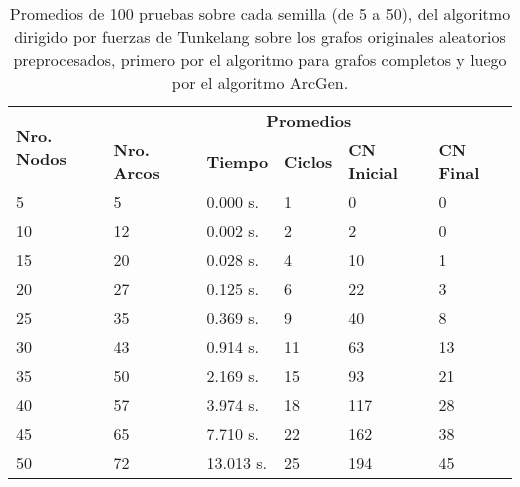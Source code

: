 	
	
	
	
	\begin{table}[H]
		\caption{Promedios de 100 pruebas sobre cada semilla (de 5 a 50), del algoritmo dirigido por fuerzas de Tunkelang sobre los grafos originales aleatorios preprocesados, primero por el algoritmo para grafos completos y luego por el algoritmo ArcGen.}
		\label{tab:resultados_orig_alg_com_gen_fue}
		\begin{tabularx}{\linewidth}{|X|X|p{1.5cm}|X|X|X|}
			\hline
			\multirow{2}{2cm}{\textbf{Nro. Nodos}} & \multicolumn{5}{c|}{\textbf{Promedios}} \\
			\cline{2-6}
			& \textbf{Nro. Arcos} & \textbf{Tiempo} & \textbf{Ciclos} & \textbf{CN Inicial} & \textbf{CN Final} \\
			\hline
			5 & 5 & 0.000 s. & 1 & 0 & 0 \\
			\hline
			10 & 12 & 0.002 s. & 2 & 2 & 0 \\
			\hline
			15 & 20 & 0.028 s. & 4 & 10 & 1 \\
			\hline
			20 & 27 & 0.125 s. & 6 & 22 & 3 \\
			\hline
			25 & 35 & 0.369 s. & 9 & 40 & 8 \\
			\hline
			30 & 43 & 0.914 s. & 11 & 63 & 13 \\
			\hline
			35 & 50 & 2.169 s. & 15 & 93 & 21 \\
			\hline
			40 & 57 & 3.974 s. & 18 & 117 & 28 \\
			\hline
			45 & 65 & 7.710 s. & 22 & 162 & 38 \\
			\hline
			50 & 72 & 13.013 s. & 25 & 194 & 45 \\
			\hline
		\end{tabularx}
	\end{table}
	
